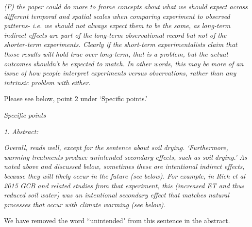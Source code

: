 \documentclass[11pt,a4paper]{letter}
\begin{document}
\par \emph{(F) the paper could do more to frame concepts about what we should expect across different temporal and spatial scales when comparing experiment to observed patterns- i.e. we should not always expect them to be the same, as long-term indirect effects are part of the long-term observational record but not of the shorter-term experiments. Clearly if the short-term experimentalists claim that those results will hold true over long-term, that is a problem, but the actual outcomes shouldn't be expected to match. In other words, this may be more of an issue of how people interpret experiments versus observations, rather than any intrinsic problem with either.}

\par Please see below, point 2 under `Specific points.'

\emph{Specific points}
\\
\par \emph{1. Abstract:}
\par \emph{Overall, reads well, except for the sentence about soil drying. `Furthermore, warming treatments produce unintended secondary effects, such as soil drying.' As noted above and discussed below, sometimes these are intentional indirect effects, because they will likely occur in the future (see below). For example, in Rich et al 2015 GCB and related studies from that experiment, this (increased ET and thus reduced soil water) was an intentional secondary effect that matches natural processes that occur with climate warming (see below).}

\par We have removed the word ``unintended"  from this sentence in the abstract.
\\
\end{document}
